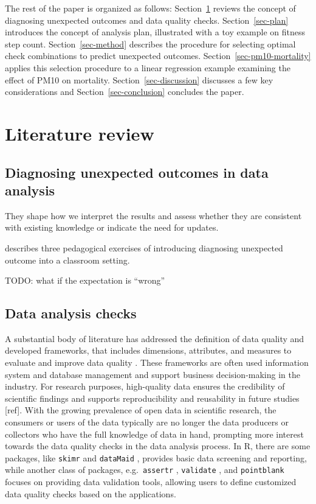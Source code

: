 \documentclass[
  12pt,
]{interact}
\begin{document}
The rest of the paper is organized as follows:
Section~\ref{sec-lit-review} reviews the concept of diagnosing
unexpected outcomes and data quality checks. Section~\ref{sec-plan}
introduces the concept of analysis plan, illustrated with a toy example
on fitness step count. Section~\ref{sec-method} describes the procedure
for selecting optimal check combinations to predict unexpected outcomes.
Section~\ref{sec-pm10-mortality} applies this selection procedure to a
linear regression example examining the effect of PM10 on mortality.
Section~\ref{sec-discussion} discusses a few key considerations and
Section~\ref{sec-conclusion} concludes the paper.

\section{Literature review}\label{sec-lit-review}

\subsection{Diagnosing unexpected outcomes in data
analysis}\label{diagnosing-unexpected-outcomes-in-data-analysis}

They shape how we interpret the results and assess whether they are
consistent with existing knowledge or indicate the need for updates.
\citep{grolemund_cognitive_2014}

\citep{peng_diagnosing_2021} describes three pedagogical exercises of
introducing diagnosing unexpected outcome into a classroom setting.

TODO: what if the expectation is ``wrong''

\subsection{Data analysis checks}\label{data-analysis-checks}

A substantial body of literature has addressed the definition of data
quality \citep[more]{8642813} and developed frameworks, that includes
dimensions, attributes, and measures to evaluate and improve data
quality
\citep{cai2015challenges, wang1996beyond, 6204995, woodall2014classification}.
These frameworks are often used information system and database
management and support business decision-making in the industry. For
research purposes, high-quality data ensures the credibility of
scientific findings and supports reproducibility and reusability in
future studies {[}ref{]}. With the growing prevalence of open data in
scientific research, the consumers or users of the data typically are no
longer the data producers or collectors who have the full knowledge of
data in hand, prompting more interest towards the data quality checks in
the data analysis process. In R, there are some packages, like
\texttt{skimr} \citep{skimr} and \texttt{dataMaid} \citep{dataMaid},
provides basic data screening and reporting, while another class of
packages, e.g.~\texttt{assertr} \citep{assertr}, \texttt{validate}
\citep{validate}, and \texttt{pointblank} \citep{pointblank} focuses on
providing data validation tools, allowing users to define customized
data quality checks based on the applications.
\end{document}
